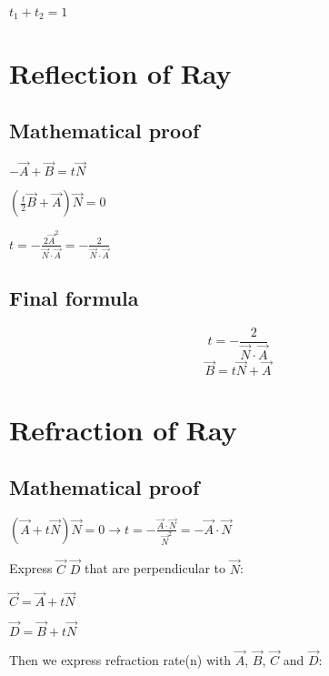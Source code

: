 \documentclass{article}
\begin{document}
$t_1 + t_2 = 1$

\section{Reflection of Ray}
\subsection{Mathematical proof}
$-\vec{A} + \vec{B} = t\vec{N}$

$(\frac{t}{2}\vec{B} + \vec{A})\vec{N} = 0$

$t = -\frac{2\vec{A}^2}{\vec{N} \cdot \vec{A}} = -\frac{2}{\vec{N} \cdot \vec{A}}$

\subsection{Final formula}
\begin{equation}
t = -\frac{2}{\vec{N} \cdot \vec{A}}
\end{equation}
\begin{equation}
\vec{B} = t\vec{N} + \vec{A}
\end{equation}

\section{Refraction of Ray}
\subsection{Mathematical proof}

$
(\vec{A} + t\vec{N})\vec{N} = 0
\rightarrow
t = -\frac{\vec{A} \cdot \vec{N}}{\vec{N}^2}
=
-\vec{A} \cdot \vec{N}
$

Express $\vec{C}$ $\vec{D}$ that are perpendicular to $\vec{N}$:

$\vec{C} = \vec{A} + t\vec{N}$

$\vec{D} = \vec{B} + t\vec{N}$

Then we express refraction rate(n) with $\vec{A}$, $\vec{B}$, $\vec{C}$ and $\vec{D}$:
\end{document}
